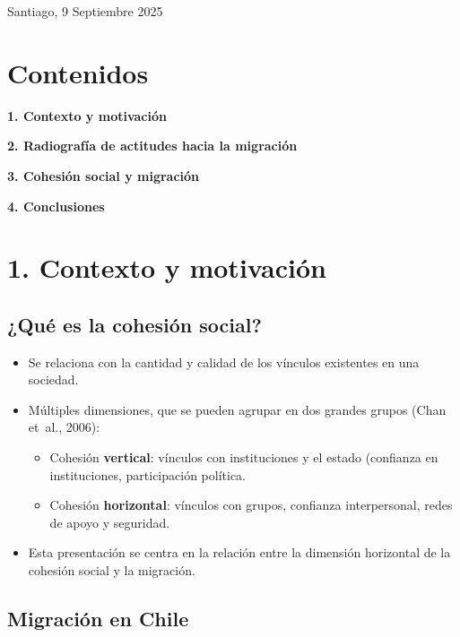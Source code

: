 \documentclass[
  spanish,
  letterpaper,
  DIV=11,
  numbers=noendperiod,
  oneside]{scrartcl}
\begin{document}
Santiago, 9 Septiembre 2025

\section{Contenidos}\label{contenidos}

\textbf{1. Contexto y motivación}

\textbf{2. Radiografía de actitudes hacia la migración}

\textbf{3. Cohesión social y migración}

\textbf{4. Conclusiones}

\section{1. Contexto y motivación}\label{contexto-y-motivaciuxf3n}

\subsection{¿Qué es la cohesión
social?}\label{quuxe9-es-la-cohesiuxf3n-social}

\begin{itemize}
\item
  Se relaciona con la cantidad y calidad de los vínculos existentes en
  una sociedad.
\item
  Múltiples dimensiones, que se pueden agrupar en dos grandes grupos
  (Chan et~al., 2006):

  \begin{itemize}
  \item
    Cohesión \textbf{vertical}: vínculos con instituciones y el estado
    (confianza en instituciones, participación política.
  \item
    Cohesión \textbf{horizontal}: vínculos con grupos, confianza
    interpersonal, redes de apoyo y seguridad.
  \end{itemize}
\item
  Esta presentación se centra en la relación entre la dimensión
  horizontal de la cohesión social y la migración.
\end{itemize}

\subsection{Migración en Chile}\label{migraciuxf3n-en-chile}
\end{document}
